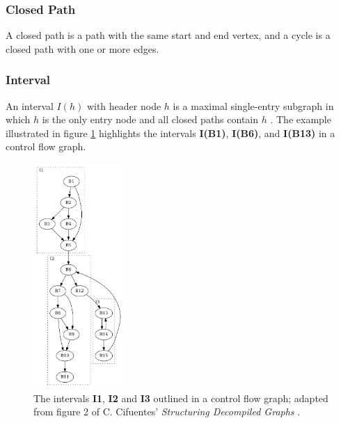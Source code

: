 \subsubsection{Closed Path}

A closed path is a path with the same start and end vertex, and a cycle is a closed path with one or more edges.


\subsubsection{Interval}


An interval $I(h)$ with header node $h$ is a maximal single-entry subgraph in which $h$ is the only entry node and all closed paths contain $h$ \cite{structuring_algorithm_for_decompilation}. The example illustrated in figure \ref{fig:interval} highlights the intervals \textbf{I(B1)}, \textbf{I(B6)}, and \textbf{I(B13)} in a control flow graph.

\begin{figure}[htbp]
	\centering
	\includegraphics[width=0.3\textwidth]{inc/appendices/vocabulary/interval.png}
	\caption{The intervals \textbf{I1}, \textbf{I2} and \textbf{I3} outlined in a control flow graph; adapted from figure 2 of C. Cifuentes' \textit{Structuring Decompiled Graphs} \cite{structuring_decompiled_graphs}.}
	\label{fig:interval}
\end{figure}
